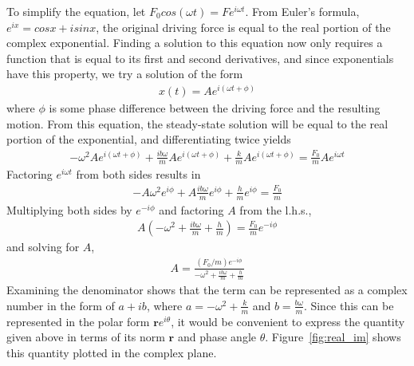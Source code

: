 \documentclass[twocolumn,english]{IEEEtran}
\theoremstyle{plain}
\theoremstyle{plain}
\begin{document}
  To simplify the equation, let $F_0cos(\omega t) = Fe^{i\omega t}$. From Euler's formula, $e^{ix} = cosx + isinx$, the original driving force is equal to the real portion of the complex exponential. Finding a solution to this equation now only requires a function that is equal to its first and second derivatives, and since exponentials have this property, we try a solution of the form
  \begin{align*}
   x(t) = Ae^{i(\omega t + \phi)}
  \end{align*}
  where $\phi$ is some phase difference between the driving force and the resulting motion. From this equation, the steady-state solution will be equal to the real portion of the exponential, and differentiating twice yields
  \begin{align*}
   -\omega^2 Ae^{i(\omega t + \phi)} + \frac{ib\omega}{m}Ae^{i(\omega t + \phi)} + \frac{k}{m}Ae^{i(\omega t + \phi)} = \frac{F_0}{m}Ae^{i\omega t}
  \end{align*}
  Factoring $e^{i\omega t}$ from both sides results in
  \begin{align*}
   -A\omega^2e^{i\phi}+A\frac{ib\omega}{m}e^{i\phi} + \frac{h}{m}e^{i\phi} = \frac{F_0}{m}
  \end{align*}
  Multiplying both sides by $e^{-i\phi}$ and factoring $A$ from the l.h.s.,
  \begin{align*}
    A\left(-\omega^2+\frac{ib\omega}{m} + \frac{h}{m}\right) = \frac{F_0}{m}e^{-i\phi}
  \end{align*}
  and solving for $A$,
  \begin{align}\label{eq:showing-a}
   A = \frac{(F_0/m)e^{-i\phi}}{-\omega^2+\frac{ib\omega}{m} + \frac{h}{m}}
  \end{align}
  Examining the denominator shows that the term can be represented as a complex number in the form of $a + ib$, where $a = -\omega^2 + \frac{k}{m}$ and $b = \frac{b\omega}{m}$. Since this can be represented in the polar form $\mathbf{r}e^{i\theta}$, it would be convenient to express the quantity given above in terms of its norm $\mathbf{r}$ and phase angle $\theta$. Figure~\ref{fig:real_im} shows this quantity plotted in the complex plane.
\end{document}

